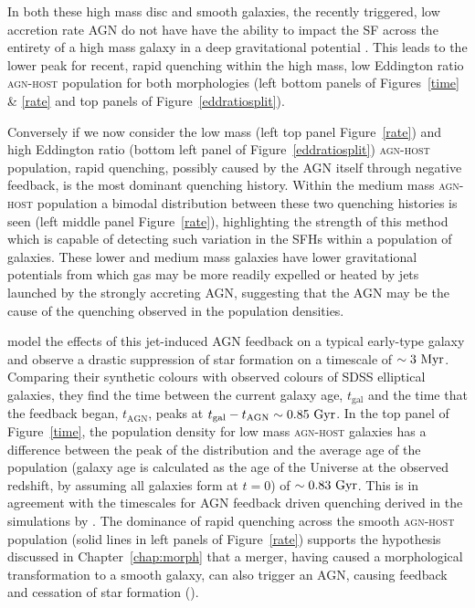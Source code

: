 In both these high mass disc and smooth galaxies, the recently triggered, low accretion rate AGN do not have have the ability to impact the SF across the entirety of a high mass galaxy in a deep gravitational potential \citep{ishibashi12, Zinn13}. This leads to the lower peak for recent, rapid quenching within the high mass, low Eddington ratio \textsc{agn-host} population for both morphologies (left bottom panels of Figures~\ref{time} \& \ref{rate} and top panels of Figure~\ref{eddratiosplit}). 

Conversely if we now consider the low mass (left top panel Figure~\ref{rate}) and high Eddington ratio (bottom left panel of Figure~\ref{eddratiosplit}) \textsc{agn-host} population, rapid quenching, possibly caused by the AGN itself through negative feedback, is the most dominant quenching history. Within the medium mass \textsc{agn-host} population a bimodal distribution between these two quenching histories is seen (left middle panel Figure~\ref{rate}), highlighting the strength of this method which is capable of detecting such variation in the SFHs within a population of galaxies. These lower and medium mass galaxies have lower gravitational potentials from which gas may be more readily expelled or heated \citep{tortora09} by jets launched by the strongly accreting AGN, suggesting that the AGN may be the cause of the quenching observed in the population densities.

\cite{tortora09} model the effects of this jet-induced AGN feedback on a typical early-type galaxy and observe a drastic suppression of star formation on a timescale of $\sim 3 ~\rm{Myr}$. Comparing their synthetic colours with observed colours of SDSS elliptical galaxies, they find the time between the current galaxy age, $t_\mathrm{gal}$ and the time that the feedback began, $t_\mathrm{AGN}$, peaks at $t_\mathrm{gal} - t_\mathrm{AGN} \sim 0.85 ~\rm{Gyr}$. In the top panel of Figure~\ref{time}, the population density for low mass \textsc{agn-host} galaxies has a difference between the peak of the distribution and the average age of the population (galaxy age is calculated as the age of the Universe at the observed redshift, by assuming all galaxies form at $t=0$) of $\sim0.83 ~\rm{Gyr}$. This is in agreement with the timescales for AGN feedback driven quenching derived in the simulations by \citet{tortora09}. The dominance of rapid quenching across the smooth \textsc{agn-host} population (solid lines in left panels of Figure~\ref{rate}) supports the hypothesis discussed in Chapter~\ref{chap:morph} that a merger, having caused a morphological transformation to a smooth galaxy, can also trigger an AGN, causing feedback and cessation of star formation (\citealt{sanders88, pontzen16}).

